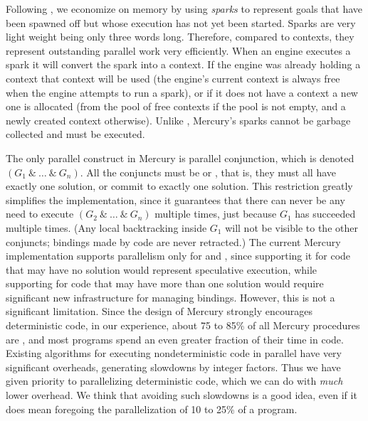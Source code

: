 Following \citet{simonmar_2009_multicore_rts},
we economize on memory by using \emph{sparks}
to represent goals that have been spawned off
but whose execution has not yet been started.
Sparks are very light weight being only three words long.
Therefore, compared to contexts,
they represent outstanding parallel work very efficiently.
When an engine executes a spark it will convert the spark into a context.
If the engine was already holding a context that context will be used
(the engine's current context is always free when the engine attempts to run
a spark),
or if it does not have a context a new one is allocated
(from the pool of free contexts if the pool is not empty,
and a newly created context otherwise).
Unlike \cite{simonmar_2009_multicore_rts},
Mercury's sparks cannot be garbage collected and must be executed.

The only parallel construct in Mercury is parallel conjunction,
which is denoted $(G_1~\&~\ldots~\&~G_n)$.
All the conjuncts must be \ddet or \dccmulti,
that is, they must all have exactly one solution,
or commit to exactly one solution.
This restriction greatly simplifies the implementation,
since it guarantees that there can never be any need
to execute $(G_2~\&~\ldots~\&~G_n)$ multiple times,
just because $G_1$ has succeeded multiple times.
(Any local backtracking inside $G_1$ will not be visible to the other conjuncts;
bindings made by \ddet code are never retracted.)
The current Mercury implementation supports parallelism only for \ddet and \dccmulti,
since supporting it for code that may have no solution
would represent speculative execution,
while supporting for code that may have more than one solution
would require significant new infrastructure for managing bindings.
However, this is not a significant limitation.
Since the design of Mercury strongly encourages deterministic code,
in our experience, about 75 to 85\% of all Mercury procedures are \ddet,
and most programs spend an even greater fraction of their time in \ddet code.
Existing algorithms for executing nondeterministic code in parallel
have very significant overheads, generating slowdowns by integer factors.
Thus we have given priority to parallelizing deterministic code,
which we can do with \emph{much} lower overhead.
We think that avoiding such slowdowns is a good idea,
even if it does mean foregoing the parallelization of 10 to 25\% of a program.

